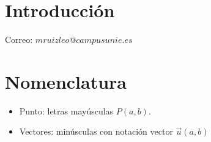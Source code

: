 \documentclass{../Geometria.tex}
\begin{document}
\section{Introducción}
Correo: $mruizleo@campusunie.es$\\
\section{Nomenclatura}
\begin{itemize}
	\item Punto: letras mayúsculas $P(a,b)$.
	\item Vectores: minúsculas con notación vector $\vec{u}(a,b)$ 
\end{itemize}
\end{document}
